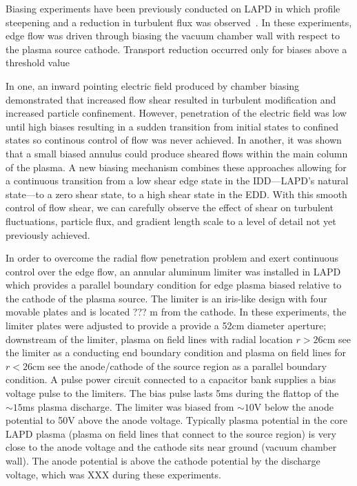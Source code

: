 \documentclass[aps,prl,amsmath,amssymb,preprint,superscriptaddress]{revtex4}
\begin{document}
Biasing experiments have been previously conducted on LAPD in which profile steepening and a reduction in turbulent flux was observed~\cite{maggs07,carter09}. In these experiments, edge flow was driven through biasing the vacuum chamber wall with respect to the plasma source cathode.  Transport reduction occurred only for biases above a threshold value  

In one, an inward pointing electric field produced by chamber biasing demonstrated that increased flow shear resulted in turbulent modification and increased particle confinement\cite{carter09}. However, penetration of the electric field was low until high biases resulting in a sudden transition from initial states to confined states so continous control of flow was never achieved. In another, it was shown that a small biased annulus could produce sheared flows within the main column of the plasma\cite{zhou12}. A new biasing mechanism combines these approaches allowing for a continuous transition from a low shear edge state in the IDD---LAPD's natural state---to a zero shear state, to a high shear state in the EDD. With this smooth control of flow shear, we can carefully observe the effect of shear on turbulent fluctuations, particle flux, and gradient length scale to a level of detail not yet previously achieved.

In order to overcome the radial flow penetration problem and exert continuous control over the edge flow, an annular aluminum limiter was installed in LAPD which provides a parallel boundary condition for edge plasma 
biased relative to the cathode of the plasma source.  The limiter is
an iris-like design with four movable plates and is located ??? m from
the cathode.  In these experiments, the limiter plates were adjusted
to provide a provide a 52cm diameter aperture; downstream of the
limiter, plasma on field lines with radial location $r>26$cm see the
limiter as a conducting end boundary condition and plasma on field
lines for $r<26$cm see the anode/cathode of the source region as a
parallel boundary condition.  A pulse power circuit connected to a
capacitor bank supplies a bias voltage pulse to the limiters.  The
bias pulse lasts 5ms during the flattop of the $\sim 15$ms plasma
discharge. The limiter was biased from $\sim 10$V below the anode
potential to 50V above the anode voltage.  Typically plasma potential
in the core LAPD plasma (plasma on field lines that connect to the
source region) is very close to the anode voltage and the cathode sits
near ground (vacuum chamber wall).  The anode potential is above the
cathode potential by the discharge voltage, which was XXX during these experiments.
\end{document}
